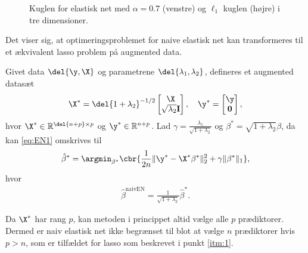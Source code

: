 %
\begin{figure}[H]
\centering
\caption{Kuglen for elastisk net med \(\alpha=0.7\) (venstre) og \(\ell_1\) kuglen (højre) i tre dimensioner.}
\label{fig:elastisk_net}
\end{figure}
%
Det viser sig, at optimeringsproblemet for naive elastisk net kan transformeres til et ækvivalent lasso problem på augmented data.
%
\begin{lem} \label{lem:elastisk_net}
Givet data \(\del{\y, \X}\) og parametrene \(\del{\lambda_1, \lambda_2}\), defineres et augmented datasæt 
\begin{align*}
\X^* = \del{1 + \lambda_2}^{-1/2} \begin{bmatrix}
\X \\ \sqrt{\lambda_2} \mathbf{I}
\end{bmatrix}, \quad \y^* = \begin{bmatrix}
\y \\ \mathbf{0}
\end{bmatrix},
\end{align*}
hvor \(\X^* \in \mathbb{R}^{\del{n+p} \times p}\) og \(\y^* \in \mathbb{R}^{n+p}\).
Lad \(\gamma = \frac{\lambda_1}{\sqrt{1+\lambda_2}}\) og \(\beta^* = \sqrt{1+\lambda_2} \beta\), da kan \eqref{eq:EN1} omskrives til
\begin{align*}
\hat{\beta}^* = \argmin_{\beta^*} \cbr{\frac{1}{2n} \Vert \y^* - \X^* \beta^* \Vert_2^2 +\gamma \Vert \beta^* \Vert_1},
\end{align*}
hvor
\begin{align*}
\hat{\beta}^\text{naivEN} = \frac{1}{\sqrt{1+\lambda_2}} \hat{\beta}^*.
\end{align*}
\end{lem}
%
Da \(\X^*\) har rang \(p\), kan metoden i princippet altid vælge alle \(p\) prædiktorer.
Dermed er naiv elastisk net ikke begrænset til blot at vælge \(n\) prædiktorer hvis \(p > n\), som er tilfældet for lasso som beskrevet i punkt \ref{itm:1}.
